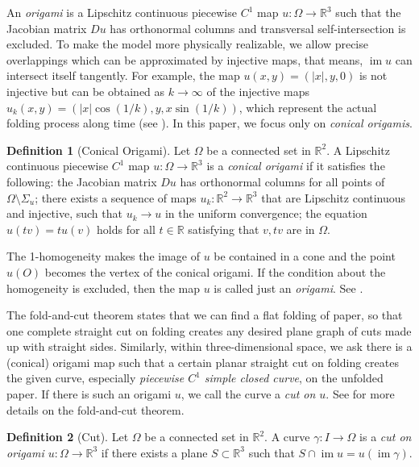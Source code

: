 \documentclass{amsart}
\theoremstyle{plain}
\theoremstyle{definition}
\newtheorem*{definition}{Definition}
\theoremstyle{remark}
\DeclareMathOperator{\im}{im}
\begin{document}
An \emph{origami} is a Lipschitz continuous piecewise $C^1$ map $u\colon\Omega\to\mathbb{R}^3$ such that the Jacobian matrix $Du$ has orthonormal columns 
and transversal self-intersection is excluded.
To make the model more physically realizable, we allow precise overlappings which can be approximated by injective maps, that means, 
$\im u$ can intersect itself tangently. 
For example, the map $u(x,y)=(|x|,y,0)$ is not injective but can be obtained as $k\to\infty$ of the injective maps $u_k(x,y)=(|x|\cos(1/k), y, x\sin(1/k))$, 
which represent the actual folding process along time (see \cite{dacorogna2008lipschitz}).
In this paper, we focus only on \emph{conical origamis}. 


\begin{definition}[Conical Origami]%
Let $\Omega$ be a connected set in $\mathbb{R}^2$. %
A Lipschitz continuous piecewise $C^1$ map $u\colon\Omega\to\mathbb{R}^3$ is a \emph{conical origami} if it satisfies the following: %
the Jacobian matrix $Du$ has orthonormal columns for all points of $\Omega\setminus\Sigma_u$; %
there exists a sequence of maps $u_k\colon\mathbb{R}^2\to\mathbb{R}^3$ that are Lipschitz continuous and injective, such that $u_k\to u$ in the uniform convergence;
the equation $u(tv)=tu(v)$ holds for all $t\in\mathbb{R}$ satisfying that $v,tv$ are in $\Omega$. %
\end{definition}

The 1-homogeneity makes the image of $u$ be contained in a cone and the point $u(O)$ becomes the vertex of the conical origami. %
If the condition about the homogeneity is excluded, then the map $u$ is called just an \emph{origami}. %
See \cite{dacorogna2008lipschitz}.

The fold-and-cut theorem states that we can find a flat folding of paper, so that one complete straight cut on folding creates any desired plane graph of cuts made up with straight sides.
Similarly, within three-dimensional space, we ask there is a (conical) origami map such that a certain planar straight cut on folding creates the given curve, especially \emph{piecewise $C^1$ simple closed curve}, on the unfolded paper.
If there is such an origami $u$, we call the curve a \emph{cut on $u$}.
See \cite{demaine2000folding} for more details on the fold-and-cut theorem. 


\begin{definition}[Cut]%
Let $\Omega$ be a connected set in $\mathbb{R}^2$.
A curve $\gamma\colon I\to\Omega$ is a \emph{cut on origami $u\colon\Omega\to\mathbb{R}^3$} if there exists a plane $S\subset\mathbb{R}^3$ such that $S\cap\im u=u(\im \gamma)$.
\end{definition}
\end{document}
